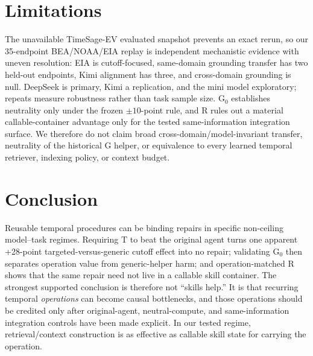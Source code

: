 \section{Limitations}
\label{sec:limitations}
The unavailable TimeSage-EV evaluated snapshot prevents an exact rerun, so our 35-endpoint BEA/NOAA/EIA replay is independent mechanistic evidence with uneven resolution: EIA is cutoff-focused, same-domain grounding transfer has two held-out endpoints, Kimi alignment has three, and cross-domain grounding is null. DeepSeek is primary, Kimi a replication, and the mini model exploratory; repeats measure robustness rather than task sample size. G$_0$ establishes neutrality only under the frozen $\pm10$-point rule, and R rules out a material callable-container advantage only for the tested same-information integration surface. We therefore do not claim broad cross-domain/model-invariant transfer, neutrality of the historical G helper, or equivalence to every learned temporal retriever, indexing policy, or context budget.

\section{Conclusion}
Reusable temporal procedures can be binding repairs in specific non-ceiling model--task regimes. Requiring T to beat the original agent turns one apparent +28-point targeted-versus-generic cutoff effect into no repair; validating G$_0$ then separates operation value from generic-helper harm; and operation-matched R shows that the same repair need not live in a callable skill container. The strongest supported conclusion is therefore not ``skills help.'' It is that recurring temporal \emph{operations} can become causal bottlenecks, and those operations should be credited only after original-agent, neutral-compute, and same-information integration controls have been made explicit. In our tested regime, retrieval/context construction is as effective as callable skill state for carrying the operation.
